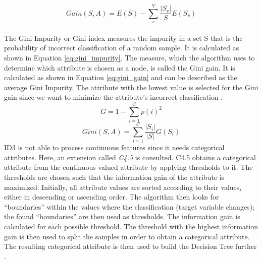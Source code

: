 \begin{equation}
 Gain(S, A) = E(S) - \sum_{v}^{V} \frac{|S_v|}{S} E(S_v)
 \label{eq:gain}
\end{equation}
\\
The Gini Impurity or Gini index measures the impurity in a set S that is the 
probability of incorrect classification of a random sample. It is calculated 
as shown in Equation \ref{eq:gini_impurity}. The measure, which the algorithm 
uses to determine which attribute is chosen as a node, is called the Gini gain. 
It is calculated as shown in Equation \ref{eq:gini_gain} and can be 
described as the average Gini Impurity. The attribute with the lowest value is 
selected for the Gini gain since we want to minimize the attribute's incorrect 
classification \cite{RN171}.
\begin{equation}
 G = 1 - \sum_{i=1}^C p(i)^2
 \label{eq:gini_impurity}
\end{equation}
\begin{equation}
 Gini(S, A) = \sum_{i=1}^C \frac{|S_i|}{|S|} G(S_i)
 \label{eq:gini_gain}
\end{equation}
ID3 is not able to process continuous features since it needs 
categorical attributes. Here, an extension called \textit{C4.5} is consulted. 
C4.5 obtains a categorical attribute from the continuous valued attribute by 
applying thresholds to it. The thresholds are chosen such that the information 
gain of the attribute is maximized. Initially, all attribute values are sorted 
according to their values, either in descending or ascending order. The 
algorithm then looks for ``boundaries'' within the values where the 
classification (target variable changes); the found ``boundaries'' are then used 
as thresholds. The information gain is calculated for each possible threshold. 
The threshold with the highest information gain is then used to split the 
samples in order to obtain a categorical attribute. The resulting categorical 
attribute is then used to build the Decision Tree further \cite{RN209, RN208}.

